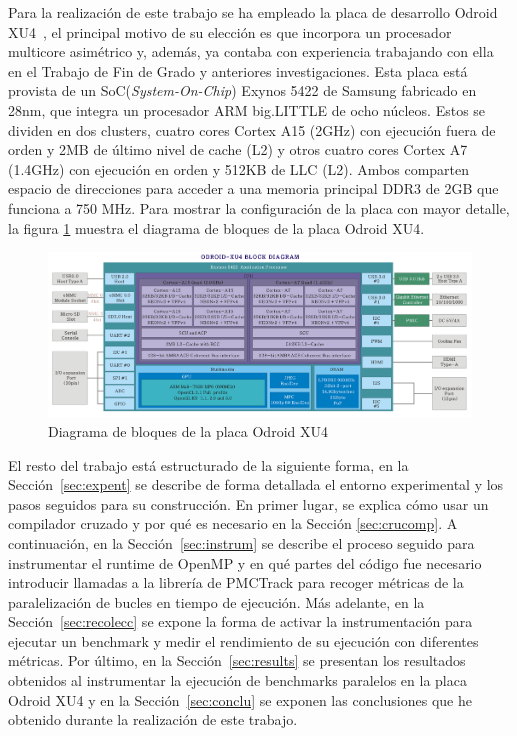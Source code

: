 Para la realización de este trabajo se ha empleado la placa de desarrollo Odroid XU4~\cite{odroid-manual}, el principal motivo de su elección es que incorpora un procesador multicore asimétrico y, además, ya contaba con experiencia trabajando con ella en el Trabajo de Fin de Grado y anteriores investigaciones. Esta placa está provista de un SoC(\emph{System-On-Chip}) Exynos 5422 de Samsung fabricado en 28nm, que integra un procesador ARM big.LITTLE de ocho núcleos. Estos se dividen en dos clusters, cuatro cores Cortex A15 (2GHz) con ejecución fuera de orden y 2MB de último nivel de cache (L2) y otros cuatro cores Cortex A7 (1.4GHz) con ejecución en orden y 512KB de LLC (L2). Ambos comparten espacio de direcciones para acceder a una memoria principal DDR3 de 2GB que funciona a 750  MHz. Para mostrar la configuración de la placa con mayor detalle, la figura \ref{fig:diagramaDeBloquesXU4} muestra el diagrama de bloques de la placa Odroid XU4.


\begin{figure}[tbp]
    \centering
    \includegraphics[width=1\textwidth]{diagrama_de_bloques_ODROID_XU4.png}
    \caption{Diagrama de bloques de la placa Odroid XU4}
    \label{fig:diagramaDeBloquesXU4}
\end{figure}


El resto del trabajo está estructurado de la siguiente forma, en la Sección~\ref{sec:expent} se describe de forma detallada el entorno experimental y los pasos seguidos para su construcción. En primer lugar, se explica cómo usar un compilador cruzado y por qué es necesario en la Sección \ref{sec:crucomp}. A continuación, en la Sección~\ref{sec:instrum} se describe el proceso seguido para instrumentar el runtime de OpenMP y en qué partes del código fue necesario introducir llamadas a la librería de PMCTrack para recoger métricas de la paralelización de bucles en tiempo de ejecución. Más adelante, en la Sección~\ref{sec:recolecc} se expone la forma de activar la instrumentación para ejecutar un benchmark y medir el rendimiento de su ejecución con diferentes métricas. Por último, en la Sección~\ref{sec:results} se presentan los resultados obtenidos al instrumentar la ejecución de benchmarks paralelos en la placa Odroid XU4 y en la Sección~\ref{sec:conclu} se exponen las conclusiones que he obtenido durante la realización de este trabajo.

